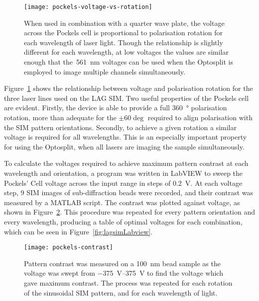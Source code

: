 \begin{figure}[htbp!]
\centering
\texttt{[image: pockels-voltage-vs-rotation]}
\caption[LAG SIM: A Pockels cell is used to rotate the polarisation of laser light for maximum SIM pattern contrast]{When used in combination with a quarter wave plate, the voltage across the Pockels cell is proportional to polarisation rotation for each wavelength of laser light. Though the relationship is slightly different for each wavelength, at low voltages the values are similar enough that the~\SI{561}{\nano\metre} voltages can be used when the Optosplit is employed to image multiple channels simultaneously.}
\label{fig:pockels-voltage-rotation}
\end{figure}

Figure~\ref{fig:pockels-voltage-rotation} shows the relationship between voltage and polarisation rotation for the three laser lines used on the LAG SIM. 
Two useful properties of the Pockels cell are evident. 
Firstly, the device is able to provide a full \SI{360}{\degree} polarisation rotation, more than adequate for the $\pm60\deg$ required to align polarisation with the SIM pattern orientations. 
Secondly, to achieve a given rotation a similar voltage is required for all wavelengths. 
This is an especially important property for using the Optosplit, when all lasers are imaging the sample simultaneously. 

To calculate the voltages required to achieve maximum pattern contrast at each wavelength and orientation, a program was written in LabVIEW to sweep the Pockels' Cell voltage across the input range in steps of \SI{0.2}{\volt}. 
At each voltage step, 9 SIM images of sub-diffraction beads were recorded, and their contrast was measured by a MATLAB script. 
The contrast was plotted against voltage, as shown in Figure~\ref{fig:pockels-contrast}.
This procedure was repeated for every pattern orientation and every wavelength, producing a table of optimal voltages for each combination, which can be seen in Figure~\ref{fig:lagsimLabview}. 

\begin{figure}[htbp!]
\centering
\texttt{[image: pockels-contrast]}
\caption[LAG SIM: Measurements of a bead sample reveal the ideal Pockels cell voltages for maximum pattern contrast]{Pattern contrast was measured on a \SI{100}{\nano\metre} bead sample as the voltage was swept from \SIrange{-375}{375}{\volt} to find the voltage which gave maximum contrast. The process was repeated for each rotation of the sinusoidal SIM pattern, and for each wavelength of light. }
\label{fig:pockels-contrast}
\end{figure}

